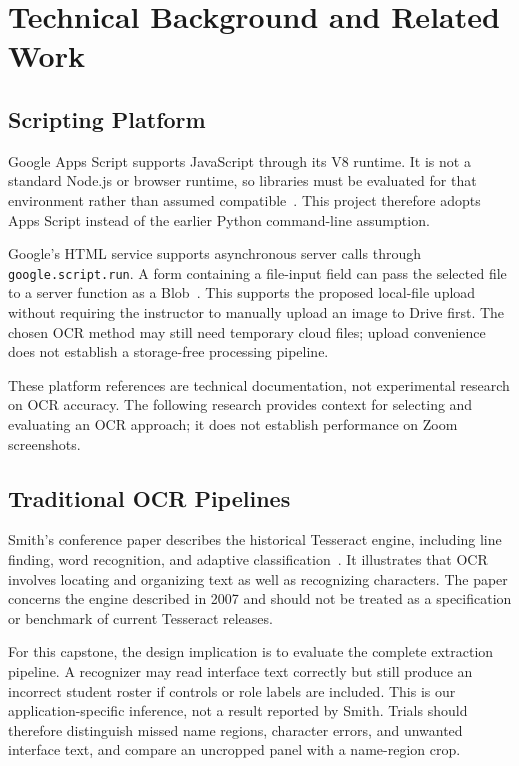 \section{Technical Background and Related Work}
\subsection{Scripting Platform}
Google Apps Script supports JavaScript through its V8 runtime. It is not a
standard Node.js or browser runtime, so libraries must be evaluated for that
environment rather than assumed compatible~\cite{googleAppsScriptV8}.
This project therefore adopts Apps Script instead of the earlier Python
command-line assumption.

Google's HTML service supports asynchronous server calls through
\texttt{google.script.run}. A form containing a file-input field can pass the
selected file to a server function as a Blob~\cite{googleHtmlCommunication}.
This supports the proposed local-file upload without requiring the instructor
to manually upload an image to Drive first. The chosen OCR method may still
need temporary cloud files; upload convenience does not establish a
storage-free processing pipeline.

These platform references are technical documentation, not experimental research
on OCR accuracy. The following research provides context for selecting and
evaluating an OCR approach; it does not establish performance on Zoom screenshots.

\subsection{Traditional OCR Pipelines}
Smith's conference paper describes the historical Tesseract engine, including
line finding, word recognition, and adaptive classification~\cite{smith2007tesseract}.
It illustrates that OCR involves locating and organizing text as well as
recognizing characters. The paper concerns the engine described in 2007 and
should not be treated as a specification or benchmark of current Tesseract releases.

For this capstone, the design implication is to evaluate the complete extraction
pipeline. A recognizer may read interface text correctly but still produce an
incorrect student roster if controls or role labels are included. This is our
application-specific inference, not a result reported by Smith. Trials should
therefore distinguish missed name regions, character errors, and unwanted
interface text, and compare an uncropped panel with a name-region crop.

